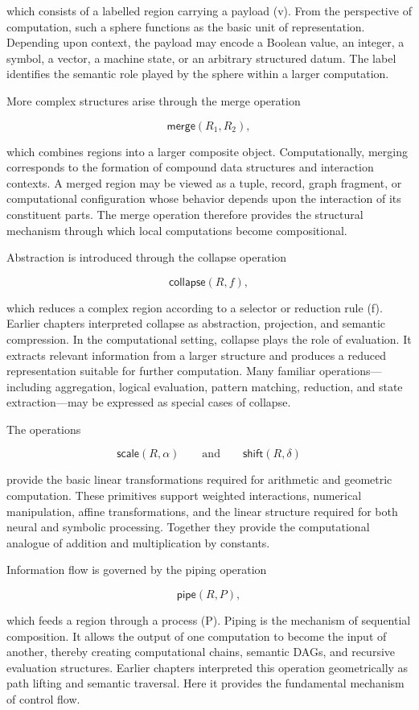 \documentclass[12pt,letterpaper]{article}
\theoremstyle{remark}
\begin{document}
which consists of a labelled region carrying a payload (v). From the perspective of computation, such a sphere functions as the basic unit of representation. Depending upon context, the payload may encode a Boolean value, an integer, a symbol, a vector, a machine state, or an arbitrary structured datum. The label identifies the semantic role played by the sphere within a larger computation.

More complex structures arise through the merge operation

\[
\mathsf{merge}(R_1,R_2),
\]

which combines regions into a larger composite object. Computationally, merging corresponds to the formation of compound data structures and interaction contexts. A merged region may be viewed as a tuple, record, graph fragment, or computational configuration whose behavior depends upon the interaction of its constituent parts. The merge operation therefore provides the structural mechanism through which local computations become compositional.

Abstraction is introduced through the collapse operation

\[
\mathsf{collapse}(R,f),
\]

which reduces a complex region according to a selector or reduction rule (f). Earlier chapters interpreted collapse as abstraction, projection, and semantic compression. In the computational setting, collapse plays the role of evaluation. It extracts relevant information from a larger structure and produces a reduced representation suitable for further computation. Many familiar operations—including aggregation, logical evaluation, pattern matching, reduction, and state extraction—may be expressed as special cases of collapse.

The operations

\[
\mathsf{scale}(R,\alpha)
\qquad\text{and}\qquad
\mathsf{shift}(R,\delta)
\]

provide the basic linear transformations required for arithmetic and geometric computation. These primitives support weighted interactions, numerical manipulation, affine transformations, and the linear structure required for both neural and symbolic processing. Together they provide the computational analogue of addition and multiplication by constants.

Information flow is governed by the piping operation

\[
\mathsf{pipe}(R,P),
\]

which feeds a region through a process (P). Piping is the mechanism of sequential composition. It allows the output of one computation to become the input of another, thereby creating computational chains, semantic DAGs, and recursive evaluation structures. Earlier chapters interpreted this operation geometrically as path lifting and semantic traversal. Here it provides the fundamental mechanism of control flow.
\end{document}
